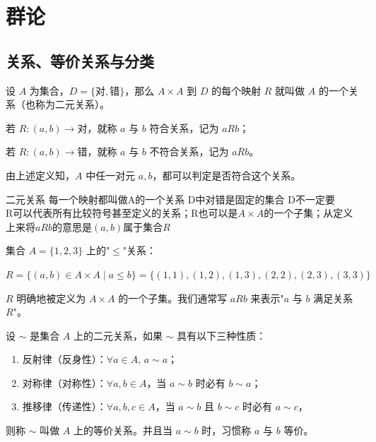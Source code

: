 \chapter{群论}

\section{关系、等价关系与分类}

\begin{definition}[二元关系]
设 $A$ 为集合，$D=\{\text{对},\text{错}\}$，那么 $A\times A$ 到 $D$ 的每个映射 $R$ 就叫做 $A$ 的一个关系（也称为二元关系）。

若 $R:(a,b)\to\text{对}$，就称 $a$ 与 $b$ 符合关系，记为 $aRb$；

若 $R:(a,b)\to\text{错}$，就称 $a$ 与 $b$ 不符合关系，记为 $a\overline{R}b$。

由上述定义知，$A$ 中任一对元 $a,b$，都可以判定是否符合这个关系。
\end{definition}

\begin{note}
二元关系 每一个映射都叫做A的一个关系 D中对错是固定的集合 D不一定要 \\
R可以代表所有比较符号甚至定义的关系；R也可以是$A\times A$的一个子集；从定义上来将$aRb$的意思是$(a,b)$属于集合$R$
\end{note}

\begin{example}
集合 $A=\{1,2,3\}$ 上的"$\le$"关系：

$R=\{(a,b)\in A\times A\mid a\le b\}=\{(1,1),(1,2),(1,3),(2,2),(2,3),(3,3)\}$

$R$ 明确地被定义为 $A\times A$ 的一个子集。我们通常写 $aRb$ 来表示"$a$ 与 $b$ 满足关系 $R$"。
\end{example}

\begin{definition}[等价关系]
设 $\sim$ 是集合 $A$ 上的二元关系，如果 $\sim$ 具有以下三种性质：
\begin{enumerate}
  \item 反射律（反身性）：$\forall a\in A,\,a\sim a$；
  \item 对称律（对称性）：$\forall a,b\in A$，当 $a\sim b$ 时必有 $b\sim a$；
  \item 推移律（传递性）：$\forall a,b,c\in A$，当 $a\sim b$ 且 $b\sim c$ 时必有 $a\sim c$，
\end{enumerate}
则称 $\sim$ 叫做 $A$ 上的等价关系。并且当 $a\sim b$ 时，习惯称 $a$ 与 $b$ 等价。
\end{definition}


